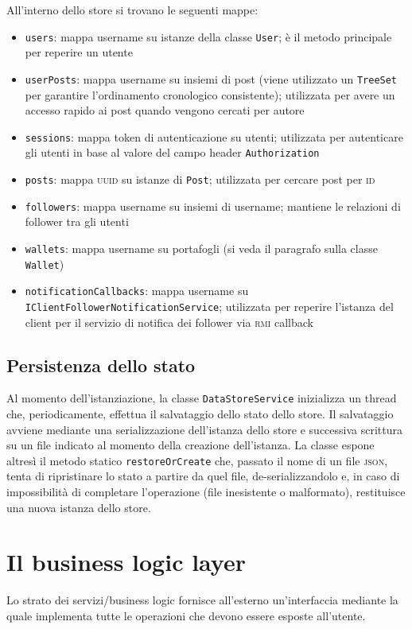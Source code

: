 \documentclass[a4paper,8pt]{article} %
\def\code#1{\texttt{#1}}
\begin{document}
\par All'interno dello store si trovano le seguenti mappe:
\begin{itemize}
    \item \code{users}: mappa username su istanze della classe \code{User}; è il metodo principale per reperire un utente
    \item \code{userPosts}: mappa username su insiemi di post (viene utilizzato un \code{TreeSet} per garantire l'ordinamento cronologico consistente); utilizzata per avere un accesso rapido ai post quando vengono cercati per autore
    \item \code{sessions}: mappa token di autenticazione su utenti; utilizzata per autenticare gli utenti in base al valore del campo header \code{Authorization}
    \item \code{posts}: mappa \textsc{uuid} su istanze di \code{Post}; utilizzata per cercare post per \textsc{id}
    \item \code{followers}: mappa username su insiemi di username; mantiene le relazioni di follower tra gli utenti
    \item \code{wallets}: mappa username su portafogli (si veda il paragrafo sulla classe \code{Wallet})
    \item \code{notificationCallbacks}: mappa username su \code{IClientFollowerNotificationService}; utilizzata per reperire l'istanza del client per il servizio di notifica dei follower via \textsc{rmi} callback
\end{itemize}
\subsection{Persistenza dello stato}
Al momento dell'istanziazione, la classe \code{DataStoreService} inizializza un thread che, periodicamente, effettua il salvataggio dello stato dello store.
Il salvataggio avviene mediante una serializzazione dell'istanza dello store e successiva scrittura su un file indicato al momento della creazione dell'istanza.
La classe espone altresì il metodo statico \code{restoreOrCreate} che, passato il nome di un file \textsc{json}, tenta di ripristinare lo stato a partire da quel file, de-serializzandolo e, in caso
di impossibilità di completare l'operazione (file inesistente o malformato), restituisce una nuova istanza dello store.


\section{Il business logic layer}
Lo strato dei servizi/business logic fornisce all'esterno un'interfaccia mediante la quale implementa tutte le operazioni che devono essere esposte all'utente.
\end{document}
